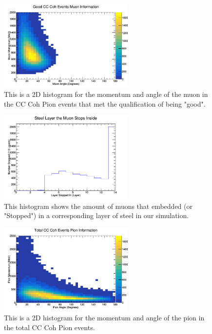 \documentclass[11pt]{article}
\begin{document}
\begin{figure}[H]
\centering
\includegraphics[width=0.6\textwidth]{NewNMReinSehgalImages/6-GoodCCCohMuonInfoNMRS.png}
\caption{This is a 2D histogram for the momentum and angle of the muon in the CC Coh Pion events that met the qualification of being "good".}
\end{figure}

\begin{figure}[H]
\centering
\includegraphics[width=0.6\textwidth]{NewNMReinSehgalImages/7-LayerPenetrationNMRS.png}
\caption{This histogram shows the amount of muons that embedded (or "Stopped") in a corresponding layer of steel in our simulation.}
\end{figure}

\begin{figure}[H]
\centering
\includegraphics[width=0.6\textwidth]{NewNMReinSehgalImages/8-TotalCCCohPionInfoNMRS.png}
\caption{This is a 2D histogram for the momentum and angle of the pion in the total CC Coh Pion events.}
\end{figure}
\end{document}
